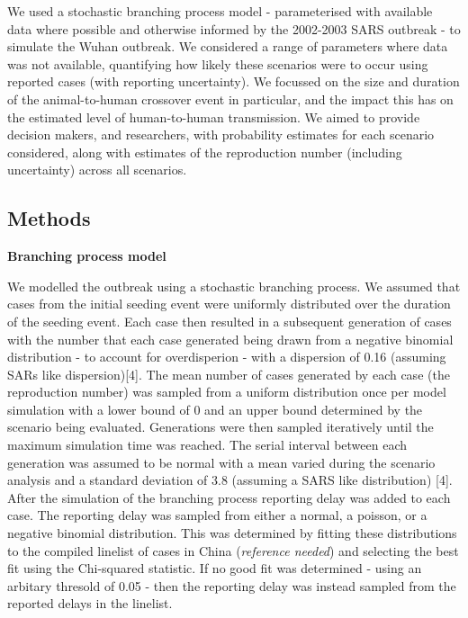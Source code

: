 \documentclass[]{article}
\begin{document}
We used a stochastic branching process model - parameterised with
available data where possible and otherwise informed by the 2002-2003
SARS outbreak - to simulate the Wuhan outbreak. We considered a range of
parameters where data was not available, quantifying how likely these
scenarios were to occur using reported cases (with reporting
uncertainty). We focussed on the size and duration of the
animal-to-human crossover event in particular, and the impact this has
on the estimated level of human-to-human transmission. We aimed to
provide decision makers, and researchers, with probability estimates for
each scenario considered, along with estimates of the reproduction
number (including uncertainty) across all scenarios.

\hypertarget{methods}{%
\subsection{Methods}\label{methods}}

\textbf{Branching process model}

We modelled the outbreak using a stochastic branching process. We
assumed that cases from the initial seeding event were uniformly
distributed over the duration of the seeding event. Each case then
resulted in a subsequent generation of cases with the number that each
case generated being drawn from a negative binomial distribution - to
account for overdisperion - with a dispersion of 0.16 (assuming SARs
like dispersion){[}4{]}. The mean number of cases generated by each case
(the reproduction number) was sampled from a uniform distribution once
per model simulation with a lower bound of 0 and an upper bound
determined by the scenario being evaluated. Generations were then
sampled iteratively until the maximum simulation time was reached. The
serial interval between each generation was assumed to be normal with a
mean varied during the scenario analysis and a standard deviation of 3.8
(assuming a SARS like distribution) {[}4{]}. After the simulation of the
branching process reporting delay was added to each case. The reporting
delay was sampled from either a normal, a poisson, or a negative
binomial distribution. This was determined by fitting these
distributions to the compiled linelist of cases in China
(\emph{reference needed}) and selecting the best fit using the
Chi-squared statistic. If no good fit was determined - using an arbitary
thresold of 0.05 - then the reporting delay was instead sampled from the
reported delays in the linelist.
\end{document}

